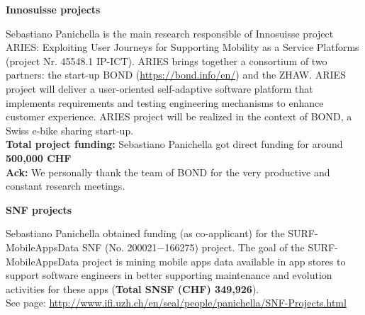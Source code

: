 \documentclass[12pt]{article}
\newcommand{\ra}{$\rightarrow$}
\newcommand{\chg}[2]{\textcolor{red}{\sout{#1}}{\ra}\textcolor{blue}{\uline{#2}}} %
\newcommand{\chg}[2]{#2}
\begin{document}
\newpage
\textbf{Innosuisse projects}
\begin{innerlist}
   \item Sebastiano Panichella is the main research responsible of Innosuisse project ARIES: Exploiting User Journeys for Supporting Mobility as a Service Platforms (project Nr. 45548.1 IP-ICT).
ARIES brings together a consortium of two partners: the start-up BOND (\href{https://bond.info/en/}{https://bond.info/en/}) and the ZHAW.
ARIES project will deliver a user-oriented self-adaptive software platform that implements requirements and testing engineering mechanisms to enhance customer experience. ARIES project will be realized in the context of BOND, a Swiss e-bike sharing start-up.\\
\textbf{Total project funding:} Sebastiano Panichella got direct funding for around \textbf{500,000 CHF}\\
\textbf{Ack:} We personally thank the team of BOND for the very productive and constant research meetings. 
\end{innerlist}

\textbf{SNF projects}
\begin{innerlist}
   \item Sebastiano Panichella obtained funding  (as co-applicant) for
   the SURF-MobileAppsData SNF (No. 200021$-$166275) project. The goal of the SURF-MobileAppsData project is mining mobile apps data available in app stores to support software engineers in better supporting maintenance and evolution activities for these apps (\textbf{Total SNSF (CHF) 349,926}). \\See page: \href{http://www.ifi.uzh.ch/en/seal/people/panichella/SNF-Projects.html}{http://www.ifi.uzh.ch/en/seal/people/panichella/SNF-Projects.html}
\end{innerlist}

\vspace{6.5mm}
\end{document}
